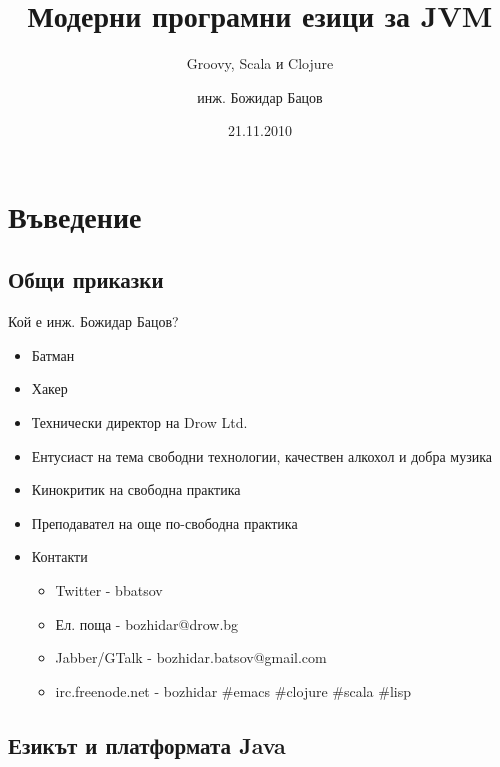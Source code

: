 \documentclass[compress,red]{beamer}
\title{Модерни програмни езици за JVM}
\subtitle{Groovy, Scala и Clojure}
\author{инж. Божидар Бацов}
\institute{OpenFest 2010}
\date{21.11.2010}
\begin{document}

\frame{
  \titlepage 
}




\section{Въведение}
\subsection{Общи приказки }
\begin{frame}{Кой е инж. Божидар Бацов?}
  \transdissolve
  \pause
  \begin{itemize}
  \item Батман \pause
  \item Хакер \pause
  \item Технически директор на Drow Ltd. \pause
  \item Ентусиаст на тема свободни технологии, качествен алкохол и
    добра музика \pause
  \item Кинокритик на свободна практика \pause
  \item Преподавател на още по-свободна практика \pause
    \item Контакти
      \begin{itemize}
        \item Twitter - bbatsov
        \item Ел. поща - bozhidar@drow.bg
        \item Jabber/GTalk - bozhidar.batsov@gmail.com
        \item irc.freenode.net - bozhidar \#emacs \#clojure \#scala \#lisp
      \end{itemize}
  \end{itemize}
\end{frame}

\subsection{Езикът и платформата Java}
\end{document}
